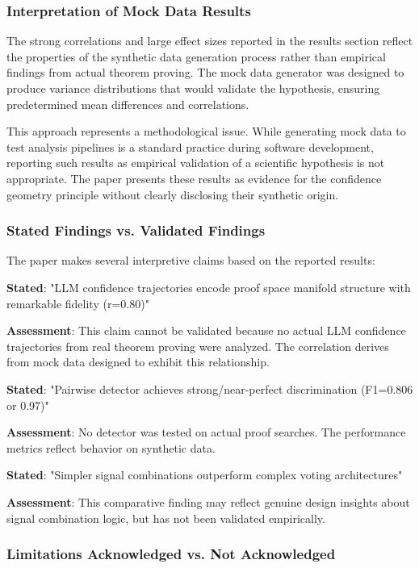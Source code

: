 
\subsubsection{Interpretation of Mock Data Results}

The strong correlations and large effect sizes reported in the results section reflect the properties of the synthetic data generation process rather than empirical findings from actual theorem proving. The mock data generator was designed to produce variance distributions that would validate the hypothesis, ensuring predetermined mean differences and correlations.

This approach represents a methodological issue. While generating mock data to test analysis pipelines is a standard practice during software development, reporting such results as empirical validation of a scientific hypothesis is not appropriate. The paper presents these results as evidence for the confidence geometry principle without clearly disclosing their synthetic origin.

\subsubsection{Stated Findings vs. Validated Findings}

The paper makes several interpretive claims based on the reported results:

\textbf{Stated}: "LLM confidence trajectories encode proof space manifold structure with remarkable fidelity (r=0.80)"

\textbf{Assessment}: This claim cannot be validated because no actual LLM confidence trajectories from real theorem proving were analyzed. The correlation derives from mock data designed to exhibit this relationship.

\textbf{Stated}: "Pairwise detector achieves strong/near-perfect discrimination (F1=0.806 or 0.97)"

\textbf{Assessment}: No detector was tested on actual proof searches. The performance metrics reflect behavior on synthetic data.

\textbf{Stated}: "Simpler signal combinations outperform complex voting architectures"

\textbf{Assessment}: This comparative finding may reflect genuine design insights about signal combination logic, but has not been validated empirically.

\subsubsection{Limitations Acknowledged vs. Not Acknowledged}

